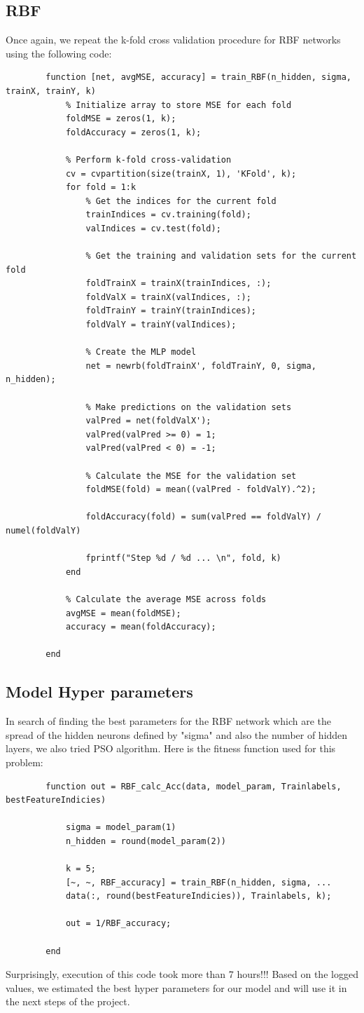 \documentclass[]{article}
\begin{document}
	\subsection{RBF}
	Once again, we repeat the k-fold cross validation procedure for RBF networks using the following code:
	\begin{lstlisting}
		function [net, avgMSE, accuracy] = train_RBF(n_hidden, sigma, trainX, trainY, k)
			% Initialize array to store MSE for each fold
			foldMSE = zeros(1, k);
			foldAccuracy = zeros(1, k);
			
			% Perform k-fold cross-validation
			cv = cvpartition(size(trainX, 1), 'KFold', k);
			for fold = 1:k
				% Get the indices for the current fold
				trainIndices = cv.training(fold);
				valIndices = cv.test(fold);
				
				% Get the training and validation sets for the current fold
				foldTrainX = trainX(trainIndices, :);
				foldValX = trainX(valIndices, :);
				foldTrainY = trainY(trainIndices);
				foldValY = trainY(valIndices);
				
				% Create the MLP model
				net = newrb(foldTrainX', foldTrainY, 0, sigma, n_hidden);
				
				% Make predictions on the validation sets
				valPred = net(foldValX');
				valPred(valPred >= 0) = 1;
				valPred(valPred < 0) = -1;
				
				% Calculate the MSE for the validation set
				foldMSE(fold) = mean((valPred - foldValY).^2);
				
				foldAccuracy(fold) = sum(valPred == foldValY) / numel(foldValY)
				
				fprintf("Step %d / %d ... \n", fold, k)
			end
			
			% Calculate the average MSE across folds
			avgMSE = mean(foldMSE);
			accuracy = mean(foldAccuracy);
			
		end
	\end{lstlisting}

	\subsection{Model Hyper parameters}
	In search of finding the best parameters for the RBF network which are the spread of the hidden neurons defined by "sigma" and also the number of hidden layers, we also tried PSO algorithm. Here is the fitness function used for this problem:
	\begin{lstlisting}
		function out = RBF_calc_Acc(data, model_param, Trainlabels, bestFeatureIndicies)
		
			sigma = model_param(1)
			n_hidden = round(model_param(2))
			
			k = 5;
			[~, ~, RBF_accuracy] = train_RBF(n_hidden, sigma, ...
			data(:, round(bestFeatureIndicies)), Trainlabels, k);
			
			out = 1/RBF_accuracy;
			
		end
	\end{lstlisting}
	Surprisingly, execution of this code took more than 7 hours!!! Based on the logged values, we estimated the best hyper parameters for our model and will use it in the next steps of the project.
	
\end{document}
